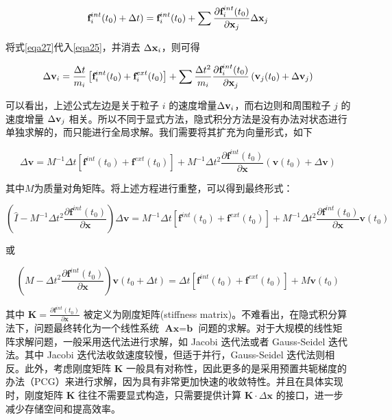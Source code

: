 \begin{equation}
\label{eqa27}
\textbf{f}_i^{int}(t_0)+ \Delta t) = \textbf{f}_i^{int}(t_0) +\sum\frac{\partial \textbf{f}_i^{int}(t_0)}{\partial \textbf{x}_j}\Delta \textbf{x}_j
\end{equation}

将式\ref{eqa27}代入\ref{eqa25}，并消去 $\Delta \textbf{x}_i$，则可得

\begin{equation}
\Delta \textbf{v}_i = \frac{\Delta t}{m_i}\left[\textbf{f}_i^{int}(t_0) + \textbf{f}_i^{ext}(t_0)\right]
           + \sum\frac{\Delta t^2}{m_i} \frac{\partial \textbf{f}_i^{int}(t_0)}{\partial \textbf{x}_j}
             \left(\textbf{v}_j(t_0) + \Delta \textbf{v}_j\right)
\end{equation}

可以看出，上述公式左边是关于粒子 $i$ 的速度增量$\Delta \textbf{v}_i$，而右边则和周围粒子 $j$ 的速度增量 $\Delta \textbf{v}_j$ 相关。所以不同于显式方法，隐式积分方法是没有办法对状态进行单独求解的，而只能进行全局求解。我们需要将其扩充为向量形式，如下

\begin{equation}
\Delta \textbf{v} = M^{-1}\Delta t\left[\textbf{f}^{int}(t_0) + \textbf{f}^{ext}(t_0)\right]
                  + M^{-1}\Delta t^2 \frac{\partial \textbf{f}^{int}(t_0)}{\partial \textbf{x}}
                    \left(\textbf{v}(t_0) + \Delta\textbf{v}\right)
\end{equation}

其中$M$为质量对角矩阵。将上述方程进行重整，可以得到最终形式：

\begin{equation}
\left(\hat{I} - M^{-1}\Delta t^2 \frac{\partial \textbf{f}^{int}(t_0)}{\partial \textbf{x}}\right)\Delta \textbf{v} = M^{-1}\Delta t\left[\textbf{f}^{int}(t_0) + \textbf{f}^{ext}(t_0)\right]
                  + M^{-1}\Delta t^2 \frac{\partial \textbf{f}^{int}(t_0)}{\partial \textbf{x}}\textbf{v}(t_0)
\end{equation}

或

\begin{equation}
\left(M - \Delta t^2 \frac{\partial \textbf{f}^{int}(t_0)}{\partial \textbf{x}}\right)\textbf{v}(t_0 + \Delta t) = \Delta t\left[\textbf{f}^{int}(t_0) + \textbf{f}^{ext}(t_0)\right]
                  + M\textbf{v}(t_0)
\end{equation}

其中 $\textbf{K} = \frac{\partial \textbf{f}^{int}(t_0)}{\partial \textbf{x}}$ 被定义为刚度矩阵(stiffness matrix)。不难看出，在隐式积分算法下，问题最终转化为一个线性系统 $\textbf{Ax} = \textbf{b}$ 问题的求解。对于大规模的线性矩阵求解问题，一般采用迭代法进行求解，如 Jacobi 迭代法或者 Gauss-Seidel 迭代法。其中 Jacobi 迭代法收敛速度较慢，但适于并行，Gauss-Seidel 迭代法则相反。此外，考虑刚度矩阵 $\textbf{K}$ 一般具有对称性，因此更多的是采用预置共轭梯度的办法（PCG）来进行求解，因为具有非常更加快速的收敛特性。并且在具体实现时，刚度矩阵 $\textbf{K}$ 往往不需要显式构造，只需要提供计算 $\textbf{K} \cdot \Delta \textbf{x}$ 的接口，进一步减少存储空间和提高效率。

